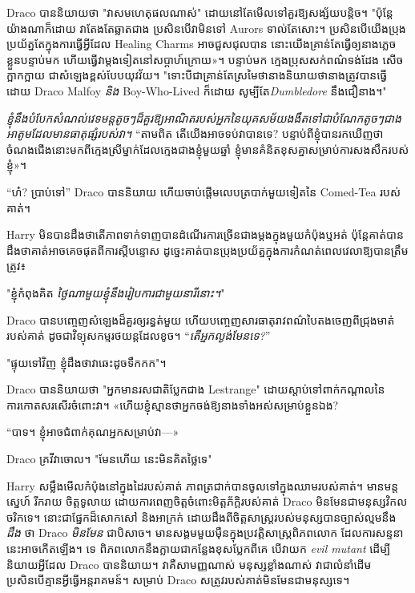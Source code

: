 Draco បាននិយាយថា "វាសមហេតុផលណាស់" ដោយនៅតែមើលទៅគួរឱ្យសង្ស័យបន្តិច។ "ប៉ុន្តែយ៉ាងណាក៏ដោយ វាតែងតែឆ្លាតជាង ប្រសិនបើវាមិនទៅ Aurors ទាល់តែសោះ។ ប្រសិន​បើ​យើង​ប្រុង​ប្រយ័ត្ន​តែ​ក្នុង​ការ​ធ្វើ​អ្វី​ដែល Healing Charms អាច​ជួសជុល​បាន នោះ​យើង​គ្រាន់​តែ​ធ្វើ​ឲ្យ​នាង​ភ្លេច​ខ្លួន​បន្ទាប់​មក ហើយ​ធ្វើ​វា​ម្ដង​ទៀត​នៅ​សប្ដាហ៍​ក្រោយ»។ បន្ទាប់មក ក្មេងប្រុសសក់ពណ៌ទង់ដែង សើចក្អាកក្អាយ ជាសំឡេងខ្ពស់បែបយុវវ័យ។ "ទោះបីជាគ្រាន់តែស្រមៃថានាងនិយាយថានាងត្រូវបានធ្វើដោយ Draco Malfoy \emph{និង} Boy-Who-Lived ក៏ដោយ សូម្បីតែ\emph{Dumbledore} នឹងជឿនាង។"

\emph{ខ្ញុំនឹងបំបែកសំណល់វេទមន្តតូចៗដ៏គួរឱ្យអាណិតរបស់អ្នកនៃយុគសម័យងងឹតទៅជាបំណែកតូចៗជាងអាតូមដែលមានធាតុផ្សំរបស់វា។} “តាមពិត តើយើងអាចទប់វាបានទេ? បន្ទាប់​ពី​ខ្ញុំ​បាន​រក​ឃើញ​ថា​ចំណង​ជើង​នោះ​មក​ពី​ក្មេង​ស្រី​ម្នាក់​ដែល​ក្មេង​ជាង​ខ្ញុំ​មួយ​ឆ្នាំ ខ្ញុំ​មាន​គំនិត​ខុស​គ្នា​សម្រាប់​ការ​សងសឹក​របស់​ខ្ញុំ»។

“ហ៎? ប្រាប់ទៅ” Draco បាននិយាយ ហើយចាប់ផ្តើមលេបត្របាក់មួយទៀតនៃ Comed-Tea របស់គាត់។

Harry មិន​បាន​ដឹង​ថា​តើ​ភាព​ទាក់ទាញ​បាន​ដំណើរការ​ច្រើន​ជាង​ម្តង​ក្នុង​មួយ​កំប៉ុង​ឬ​អត់ ប៉ុន្តែ​គាត់​បាន​ដឹង​ថា​គាត់​អាច​គេច​ផុត​ពី​ការ​ស្តី​បន្ទោស ដូច្នេះ​គាត់​បាន​ប្រុង​ប្រយ័ត្ន​ក្នុង​ការ​កំណត់​ពេលវេលា​ឱ្យ​បាន​ត្រឹមត្រូវ៖

"ខ្ញុំកំពុងគិត \emph{ថ្ងៃណាមួយខ្ញុំនឹងរៀបការជាមួយនារីនោះ។}"

Draco បានបញ្ចេញសំឡេងដ៏គួរឲ្យរន្ធត់មួយ ហើយបញ្ចេញសារធាតុរាវពណ៌បៃតងចេញពីជ្រុងមាត់របស់គាត់ ដូចជាវិទ្យុសកម្មរថយន្តដែលខូច។ “\emph{តើអ្នកល្ងង់មែនទេ?}”

"ផ្ទុយ​ទៅ​វិញ ខ្ញុំ​ដឹង​ថា​វា​ឆេះ​ដូច​ទឹកកក"។

Draco បាននិយាយថា "អ្នកមានរសជាតិប្លែកជាង Lestrange" ដោយស្តាប់ទៅពាក់កណ្តាលនៃការកោតសរសើរចំពោះវា។ «​ហើយ​ខ្ញុំ​ស្មាន​ថា​អ្នក​ចង់​ឱ្យ​នាង​ទាំងអស់​សម្រាប់​ខ្លួន​ឯង​?

“បាទ។ ខ្ញុំ​អាច​ជំពាក់​គុណ​អ្នក​សម្រាប់​វា—»

Draco គ្រវីវាចោល។ "មែនហើយ នេះមិនគិតថ្លៃទេ"

Harry សម្លឹងមើលកំប៉ុងនៅក្នុងដៃរបស់គាត់ ភាពត្រជាក់បានចូលទៅក្នុងឈាមរបស់គាត់។ មានមន្តស្នេហ៍ រីករាយ ចិត្តទូលាយ ដោយការពេញចិត្តចំពោះមិត្តភ័ក្តិរបស់គាត់ Draco មិនមែនជាមនុស្សវិកលចរិកទេ។ នោះ​ជា​ផ្នែក​ដ៏​សោកសៅ និង​អាក្រក់ ដោយ​ដឹង​ពី​ចិត្តសាស្ត្រ​របស់​មនុស្ស​បាន​ច្បាស់​ល្មម​នឹង \emph{ដឹង} ថា Draco \emph{ មិន​មែន} ជា​បិសាច។ មាន​សង្គម​មួយ​ម៉ឺន​ក្នុង​ប្រវត្តិសាស្ត្រ​ពិភពលោក ដែល​ការ​សន្ទនា​នេះ​អាច​កើត​ឡើង។ ទេ ពិភពលោក​នឹង​ក្លាយ​ជា​កន្លែង​ខុស​ប្លែក​ពី​គេ បើ​វា​យក \emph{evil mutant} ដើម្បី​និយាយ​អ្វី​ដែល Draco បាន​និយាយ។ វាគឺសាមញ្ញណាស់ មនុស្សខ្លាំងណាស់ វាជាលំនាំដើម ប្រសិនបើគ្មានអ្វីធ្វើអន្តរាគមន៍។ សម្រាប់ Draco សត្រូវរបស់គាត់មិនមែនជាមនុស្សទេ។

